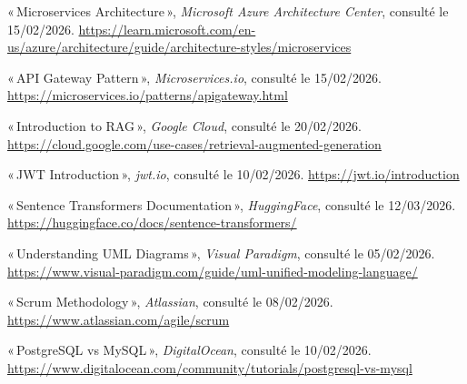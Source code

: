 \begin{enumerate}[label={[\arabic*]},resume=refs]

    \item «\,Microservices Architecture\,», \textit{Microsoft Azure Architecture Center}, consulté le 15/02/2026. \url{https://learn.microsoft.com/en-us/azure/architecture/guide/architecture-styles/microservices}

    \item «\,API Gateway Pattern\,», \textit{Microservices.io}, consulté le 15/02/2026. \url{https://microservices.io/patterns/apigateway.html}

    \item «\,Introduction to RAG\,», \textit{Google Cloud}, consulté le 20/02/2026. \url{https://cloud.google.com/use-cases/retrieval-augmented-generation}

    \item «\,JWT Introduction\,», \textit{jwt.io}, consulté le 10/02/2026. \url{https://jwt.io/introduction}

    \item «\,Sentence Transformers Documentation\,», \textit{HuggingFace}, consulté le 12/03/2026. \url{https://huggingface.co/docs/sentence-transformers/}

    \item «\,Understanding UML Diagrams\,», \textit{Visual Paradigm}, consulté le 05/02/2026. \url{https://www.visual-paradigm.com/guide/uml-unified-modeling-language/}

    \item «\,Scrum Methodology\,», \textit{Atlassian}, consulté le 08/02/2026. \url{https://www.atlassian.com/agile/scrum}

    \item «\,PostgreSQL vs MySQL\,», \textit{DigitalOcean}, consulté le 10/02/2026. \url{https://www.digitalocean.com/community/tutorials/postgresql-vs-mysql}

\end{enumerate}
